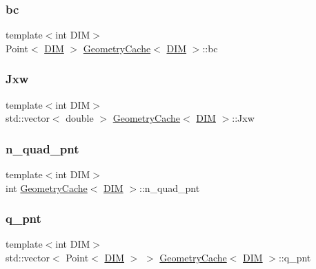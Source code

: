 \subsubsection{\texorpdfstring{bc}{bc}}
{\footnotesize\ttfamily template$<$int D\+IM$>$ \\
Point$<$ \mbox{\hyperlink{complex__node___t_h_f_e_m_2uiexp_8h_a589b8b9bfdf714f736059845d568b597}{D\+IM}} $>$ \mbox{\hyperlink{struct_geometry_cache}{Geometry\+Cache}}$<$ \mbox{\hyperlink{complex__node___t_h_f_e_m_2uiexp_8h_a589b8b9bfdf714f736059845d568b597}{D\+IM}} $>$\+::bc}

\mbox{\label{struct_geometry_cache_a31b6482011d3cc2bde276b0efce4f797}} 
\subsubsection{\texorpdfstring{Jxw}{Jxw}}
{\footnotesize\ttfamily template$<$int D\+IM$>$ \\
std\+::vector$<$ double $>$ \mbox{\hyperlink{struct_geometry_cache}{Geometry\+Cache}}$<$ \mbox{\hyperlink{complex__node___t_h_f_e_m_2uiexp_8h_a589b8b9bfdf714f736059845d568b597}{D\+IM}} $>$\+::Jxw}

\mbox{\label{struct_geometry_cache_aa053ebb5dfb918e59595f4322d32bce6}} 
\subsubsection{\texorpdfstring{n\+\_\+quad\+\_\+pnt}{n\_quad\_pnt}}
{\footnotesize\ttfamily template$<$int D\+IM$>$ \\
int \mbox{\hyperlink{struct_geometry_cache}{Geometry\+Cache}}$<$ \mbox{\hyperlink{complex__node___t_h_f_e_m_2uiexp_8h_a589b8b9bfdf714f736059845d568b597}{D\+IM}} $>$\+::n\+\_\+quad\+\_\+pnt}

\mbox{\label{struct_geometry_cache_a0af88a99d5de84b452a81e50ee60f246}} 
\subsubsection{\texorpdfstring{q\+\_\+pnt}{q\_pnt}}
{\footnotesize\ttfamily template$<$int D\+IM$>$ \\
std\+::vector$<$ Point$<$ \mbox{\hyperlink{complex__node___t_h_f_e_m_2uiexp_8h_a589b8b9bfdf714f736059845d568b597}{D\+IM}} $>$ $>$ \mbox{\hyperlink{struct_geometry_cache}{Geometry\+Cache}}$<$ \mbox{\hyperlink{complex__node___t_h_f_e_m_2uiexp_8h_a589b8b9bfdf714f736059845d568b597}{D\+IM}} $>$\+::q\+\_\+pnt}

